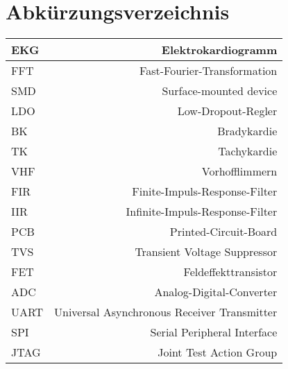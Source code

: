 
\section{Abkürzungsverzeichnis} 

\begin{tabular}[]{l|r}
EKG & Elektrokardiogramm 
\\
\hline
FFT & Fast-Fourier-Transformation 
\\
\hline
SMD & Surface-mounted device 
\\
\hline
LDO & Low-Dropout-Regler 
\\
\hline
BK & Bradykardie 
\\
\hline
TK & Tachykardie
\\
\hline
VHF & Vorhofflimmern
\\
\hline
FIR & Finite-Impuls-Response-Filter
\\
\hline
IIR & Infinite-Impuls-Response-Filter
\\
\hline
PCB & Printed-Circuit-Board
\\
\hline
TVS & Transient Voltage Suppressor
\\
\hline
FET & Feldeffekttransistor
\\
\hline
ADC & Analog-Digital-Converter
\\
\hline
UART & Universal Asynchronous Receiver Transmitter
\\
\hline
SPI & Serial Peripheral Interface
\\
\hline
JTAG & Joint Test Action Group


\end{tabular}
